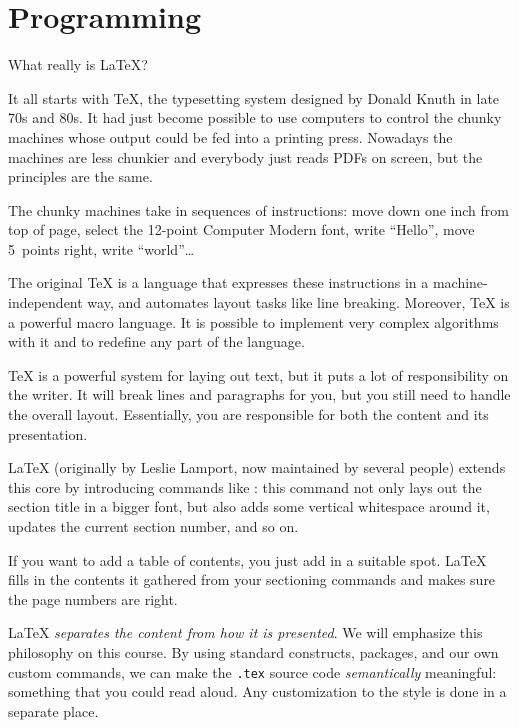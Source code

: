 
\chapter{Programming}

What really is \LaTeX?

It all starts with \TeX, the typesetting system designed by Donald Knuth in late 70s and 80s.
It had just become possible to use computers to control the chunky machines
whose output could be fed into a printing press.
Nowadays the machines are less chunkier and everybody just reads PDFs on screen,
but the principles are the same.

The chunky machines take in sequences of instructions:
move down one inch from top of page, select the 12-point Computer Modern font,
write ``Hello'', move 5~points right, write ``world''\dots{}

The original \TeX{} is a language that expresses these instructions in a machine-independent way,
and automates layout tasks like line breaking.
Moreover, \TeX{} is a powerful macro language.
It is possible to implement very complex algorithms with it
and to redefine any part of the language.

\TeX{} is a powerful system for laying out text,
but it puts a lot of responsibility on the writer.
It will break lines and paragraphs for you,
but you still need to handle the overall layout.
Essentially, you are responsible for both the content and its presentation.

\bigskip\noindent%
\LaTeX{} (originally by Leslie Lamport, now maintained by several people)
extends this core by introducing commands like :
this command not only lays out the section title in a bigger font,
but also adds some vertical whitespace around it, updates the current section number, and so on.

If you want to add a table of contents, you just add  in a suitable spot.
\LaTeX{} fills in the contents it gathered from your sectioning commands
and makes sure the page numbers are right.

\LaTeX{} \emph{separates the content from how it is presented}.
We will emphasize this philosophy on this course.
By using standard constructs, packages, and our own custom commands,
we can make the \verb|.tex| source code \emph{semantically} meaningful:
something that you could read aloud.
Any customization to the style is done in a separate place.


